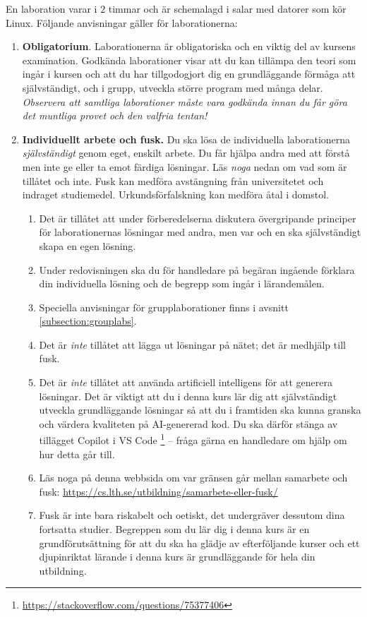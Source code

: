 En laboration varar i  $2$ timmar och är schemalagd i salar med datorer som kör Linux. Följande anvisningar gäller för laborationerna:

\begin{enumerate}

\item \textbf{Obligatorium}. Laborationerna är obligatoriska och en viktig del av kursens examination. Godkända laborationer visar att du kan tillämpa den teori som ingår i kursen och att du har tillgodogjort dig en grundläggande förmåga att självständigt, och i grupp, utveckla större program med många delar.  \emph{Observera att samtliga laborationer måste vara godkända innan du får göra det muntliga provet och den valfria tentan!}

\item  \textbf{Individuellt arbete och fusk.} Du ska lösa de individuella laborationerna \emph{självständigt} genom eget, enskilt arbete. Du får hjälpa andra med att förstå men inte ge eller ta emot färdiga lösningar. Läs \emph{noga} nedan om vad som är tillåtet och inte. Fusk kan medföra avstängning från universitetet och indraget studiemedel. Urkundsförfalskning kan medföra åtal i domstol. 
\begin{enumerate}
  \item  Det är tillåtet att under förberedelserna diskutera övergripande principer för laborationernas lösningar med andra, men var och en ska självständigt skapa en egen lösning. 
  \item Under redovisningen ska du för handledare på begäran ingående förklara din individuella lösning och de begrepp som ingår i lärandemålen. 
  \item Speciella anvisningar för grupplaborationer finns i avsnitt \ref{subsection:grouplabs}.
  \item Det är \emph{inte} tillåtet att lägga ut lösningar på nätet; det är medhjälp till fusk.
  \item Det är \emph{inte} tillåtet att använda artificiell intelligens för att generera lösningar. Det är viktigt att du i denna kurs lär dig att självständigt utveckla grundläggande lösningar så att du i framtiden ska kunna granska och värdera kvaliteten på AI-genererad kod. Du ska därför stänga av tillägget Copilot i VS Code \footnote{\url{https://stackoverflow.com/questions/75377406}} -- fråga gärna en handledare om hjälp om hur detta går till.
  \item Läs noga på denna webbsida om var gränsen går mellan samarbete och fusk: \url{https://cs.lth.se/utbildning/samarbete-eller-fusk/}
  \item Fusk är inte bara riskabelt och oetiskt, det undergräver dessutom dina fortsatta studier. Begreppen som du lär dig i denna kurs är en grundförutsättning för att du ska ha glädje av efterföljande kurser och ett djupinriktat lärande i denna kurs är grundläggande för hela din utbildning.
\end{enumerate}


\end{enumerate}

